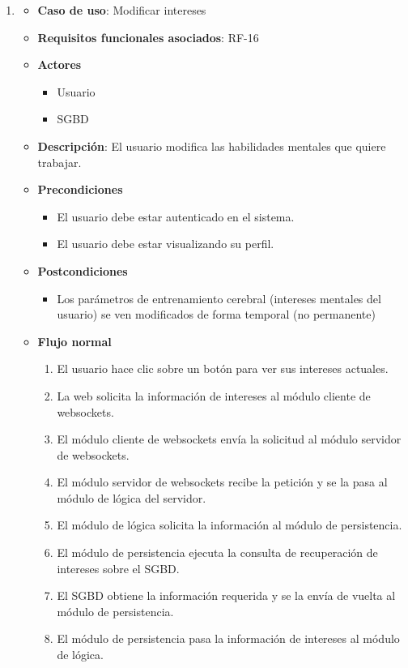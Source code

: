 \begin{enumerate}
\item %
  \begin{itemize}
  \item \textbf{Caso de uso}: Modificar intereses
  \item \textbf{Requisitos funcionales asociados}: RF-16
  \item \textbf{Actores}
    \begin{itemize}
    \item Usuario
    \item SGBD
    \end{itemize}
  \item \textbf{Descripción}: El usuario modifica las habilidades mentales que quiere trabajar.
  \item \textbf{Precondiciones}
    \begin{itemize}
    \item El usuario debe estar autenticado en el sistema.
    \item El usuario debe estar visualizando su perfil.
    \end{itemize}
  \item \textbf{Postcondiciones}
    \begin{itemize}
    \item Los parámetros de entrenamiento cerebral (intereses mentales del usuario) se ven modificados de forma temporal (no permanente)
    \end{itemize}
  \item \textbf{Flujo normal}
    \begin{enumerate}
    \item El usuario hace clic sobre un botón para ver sus intereses actuales.
    \item La web solicita la información de intereses al módulo cliente de websockets.
    \item El módulo cliente de websockets envía la solicitud al módulo servidor de websockets.
    \item El módulo servidor de websockets recibe la petición y se la pasa al módulo de lógica del servidor.
    \item El módulo de lógica solicita la información al módulo de persistencia.
    \item El módulo de persistencia ejecuta la consulta de recuperación de intereses sobre el SGBD.
    \item El SGBD obtiene la información requerida y se la envía de vuelta al módulo de persistencia.
    \item El módulo de persistencia pasa la información de intereses al módulo de lógica.

\end{enumerate}
\end{itemize}
\end{enumerate}
